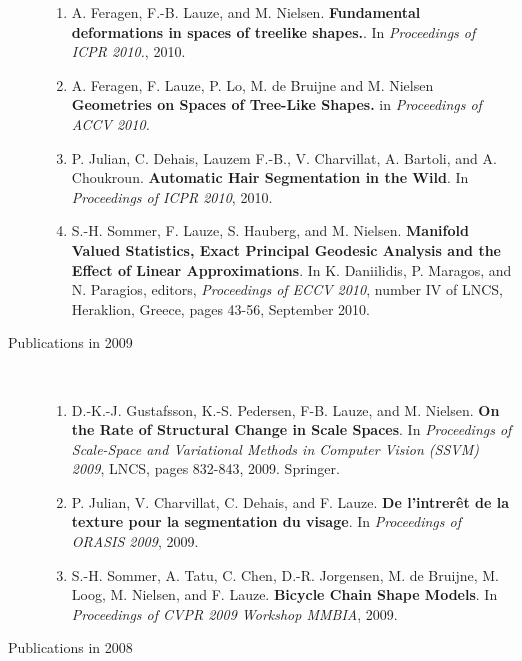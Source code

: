 \documentclass[10pt]{article}
\begin{document}
\begin{description}
\begin{enumerate}
  \item A. Feragen, F.-B. Lauze, and M. Nielsen.  \textbf{Fundamental deformations in
      spaces of treelike shapes.}.  In \textit{Proceedings of ICPR 2010.}, 2010.

  \item A. Feragen, F. Lauze, P. Lo, M. de Bruijne and M. Nielsen \textbf{Geometries on
      Spaces of Tree-Like Shapes.}  in \textit{ Proceedings of ACCV 2010.}

  \item P. Julian, C. Dehais, Lauzem F.-B., V. Charvillat, A. Bartoli, and A. Choukroun.
    \textbf{Automatic Hair Segmentation in the Wild}.  In \textit{Proceedings of ICPR
      2010}, 2010.

  \item S.-H. Sommer, F. Lauze, S. Hauberg, and M. Nielsen.  \textbf{Manifold Valued
      Statistics, Exact Principal Geodesic Analysis and the Effect of Linear
      Approximations}.  In K. Daniilidis, P. Maragos, and N. Paragios, editors,
    \textit{Proceedings of ECCV 2010}, number IV of LNCS, Heraklion, Greece, pages 43-56,
    September 2010.
  \end{enumerate}
\eject
\item[Publications in 2009]~\\
  
\begin{enumerate}
  
  \item D.-K.-J. Gustafsson, K.-S. Pedersen, F-B. Lauze, and M. Nielsen.  \textbf{On the
      Rate of Structural Change in Scale Spaces}.  In \textit{Proceedings of Scale-Space
      and Variational Methods in Computer Vision (SSVM) 2009}, LNCS, pages 832-843, 2009.
    Springer.

  \item P. Julian, V. Charvillat, C. Dehais, and F. Lauze.  \textbf{De l'intrer{\^e}t de
      la texture pour la segmentation du visage}.  In \textit{Proceedings of ORASIS 2009},
    2009.

  \item S.-H. Sommer, A. Tatu, C. Chen, D.-R. Jorgensen, M. de Bruijne, M. Loog,
    M. Nielsen, and F. Lauze.  \textbf{Bicycle Chain Shape Models}.  In
    \textit{Proceedings of CVPR 2009 Workshop MMBIA}, 2009.
  \end{enumerate}

\item[Publications in 2008]~\\


\end{description}
\end{document}

